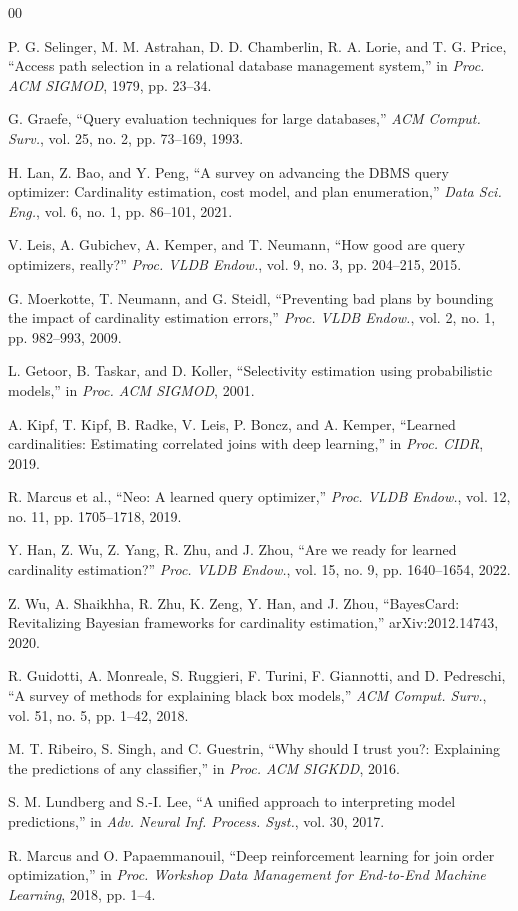 \documentclass[conference]{IEEEtran}
\begin{document}
\begin{thebibliography}{00}

 P. G. Selinger, M. M. Astrahan, D. D. Chamberlin, R. A. Lorie, and T. G. Price, ``Access path selection in a relational database management system,'' in \textit{Proc. ACM SIGMOD}, 1979, pp. 23--34.

 G. Graefe, ``Query evaluation techniques for large databases,'' \textit{ACM Comput. Surv.}, vol. 25, no. 2, pp. 73--169, 1993.

 H. Lan, Z. Bao, and Y. Peng, ``A survey on advancing the DBMS query optimizer: Cardinality estimation, cost model, and plan enumeration,'' \textit{Data Sci. Eng.}, vol. 6, no. 1, pp. 86--101, 2021.

 V. Leis, A. Gubichev, A. Kemper, and T. Neumann, ``How good are query optimizers, really?'' \textit{Proc. VLDB Endow.}, vol. 9, no. 3, pp. 204--215, 2015.

 G. Moerkotte, T. Neumann, and G. Steidl, ``Preventing bad plans by bounding the impact of cardinality estimation errors,'' \textit{Proc. VLDB Endow.}, vol. 2, no. 1, pp. 982--993, 2009.

 L. Getoor, B. Taskar, and D. Koller, ``Selectivity estimation using probabilistic models,'' in \textit{Proc. ACM SIGMOD}, 2001.

 A. Kipf, T. Kipf, B. Radke, V. Leis, P. Boncz, and A. Kemper, ``Learned cardinalities: Estimating correlated joins with deep learning,'' in \textit{Proc. CIDR}, 2019.

 R. Marcus et al., ``Neo: A learned query optimizer,'' \textit{Proc. VLDB Endow.}, vol. 12, no. 11, pp. 1705--1718, 2019.

 Y. Han, Z. Wu, Z. Yang, R. Zhu, and J. Zhou, ``Are we ready for learned cardinality estimation?'' \textit{Proc. VLDB Endow.}, vol. 15, no. 9, pp. 1640--1654, 2022.

 Z. Wu, A. Shaikhha, R. Zhu, K. Zeng, Y. Han, and J. Zhou, ``BayesCard: Revitalizing Bayesian frameworks for cardinality estimation,'' arXiv:2012.14743, 2020.

 R. Guidotti, A. Monreale, S. Ruggieri, F. Turini, F. Giannotti, and D. Pedreschi, ``A survey of methods for explaining black box models,'' \textit{ACM Comput. Surv.}, vol. 51, no. 5, pp. 1--42, 2018.

 M. T. Ribeiro, S. Singh, and C. Guestrin, ``Why should I trust you?: Explaining the predictions of any classifier,'' in \textit{Proc. ACM SIGKDD}, 2016.

 S. M. Lundberg and S.-I. Lee, ``A unified approach to interpreting model predictions,'' in \textit{Adv. Neural Inf. Process. Syst.}, vol. 30, 2017.

 R. Marcus and O. Papaemmanouil, ``Deep reinforcement learning for join order optimization,'' in \textit{Proc. Workshop Data Management for End-to-End Machine Learning}, 2018, pp. 1--4.

\end{thebibliography}
\end{document}
